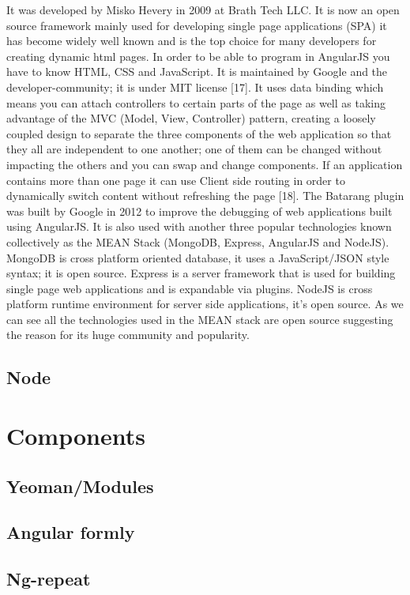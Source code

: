 It was developed by Misko Hevery in 2009 at Brath Tech LLC. It is now an
open source framework mainly used for developing single page applications
(SPA) it has become widely well known and is the top choice for many
developers for creating dynamic html pages. In order to be able to program
in AngularJS you have to know HTML, CSS and JavaScript. It is maintained by
Google and the developer-community; it is under MIT license [17]. It uses
data binding which means you can attach controllers to certain parts of the
page as well as taking advantage of the MVC (Model, View, Controller)
pattern, creating a loosely coupled design to separate the three components
of the web application so that they all are independent to one another; one of
them can be changed without impacting the others and you can swap and
change components. If an application contains more than one page it can use
Client side routing in order to dynamically switch content without refreshing
the page [18]. The Batarang plugin was built by Google in 2012 to improve
the debugging of web applications built using AngularJS. It is also used with
another three popular technologies known collectively as the MEAN Stack
(MongoDB, Express, AngularJS and NodeJS). MongoDB is cross platform
oriented database, it uses a JavaScript/JSON style syntax; it is open source.
Express is a server framework that is used for building single page web
applications and is expandable via plugins. NodeJS is cross platform runtime
environment for server side applications, it’s open source. As we can see all
the technologies used in the MEAN stack are open source suggesting the
reason for its huge community and popularity.

\subsection{Node}


\section{Components}
\subsection{Yeoman/Modules}
\subsection{Angular formly}
\subsection{Ng-repeat}
